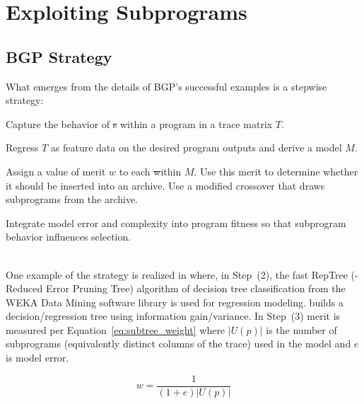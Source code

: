 \section{Exploiting Subprograms}\label{sect:foreground}
\subsection{BGP Strategy}
What emerges from the details of BGP's successful examples is a stepwise strategy:  
\begin{inparaenum}

\item Capture the behavior of \st{s} within a program in a trace matrix $T$.

\item  Regress $T$ as feature data on the desired program outputs and derive a model $M$. 

\item Assign a value of merit $w$ to each \st within $M$. Use this merit to determine whether it should be inserted into an archive. Use a modified crossover that draws subprograms from the archive. 

\item Integrate model error and complexity into program fitness so that subprogram behavior influences selection.
\end{inparaenum} \\


One example of the strategy is realized in \cite{krawiecGecco2014} where, in Step~(2), the fast RepTree (\REPTREE - Reduced  Error  Pruning  Tree) algorithm  of decision tree classification from the WEKA Data Mining software library\cite{Hall:2009:WDM:1656274.1656278} is used for regression modeling.  \REPTREE builds a decision/regression tree using information gain/variance. In Step~(3) merit is measured per Equation~\ref{eq:subtree_weight} where $|U(p)|$ is the number of subprograms (equivalently distinct columns of the trace) used in the model and $e$ is model error.


\begin{equation}
\label{eq:subtree_weight}
w = \frac{1}{(1 + e)|U(p)|}
\end{equation}

